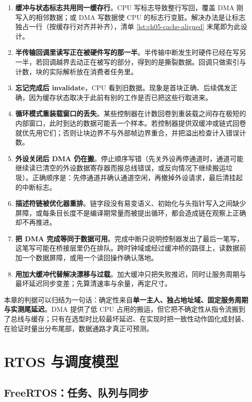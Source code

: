 \documentclass[12pt,a4paper,fontset=fandol]{ctexbook}
\begin{document}
\begin{enumerate}
\item \textbf{缓冲与状态标志共用同一缓存行}。CPU 写标志导致整行写回，覆盖 DMA 刚写入的相邻数据；或 DMA 写数据使 CPU 的标志行变脏。解决办法是让标志独占一行（按缓存行对齐并补齐），清单 \ref{lst:ch05-cache-aligned} 末尾即为此设计。
\item \textbf{半传输回调里读写正在被硬件写的那一半}。半传输中断发生时硬件已经在写另一半，若回调越界去动正在被写的部分，得到的是撕裂数据。回调只做索引与计数，块的实际解析放在消费者任务里。
\item \textbf{忘记完成后 invalidate}，CPU 看到旧数据。现象是首块正确、后续偶发正确，因为缓存状态取决于此前有别的工作是否已把这些行取进来。
\item \textbf{循环模式重装载窗口的丢失}。某些控制器在计数回卷到重装载之间存在极短的内部窗口，此时到达的数据可能丢一个样本。若控制器提供双缓冲或链式回卷就优先用它们；否则让块边界不与外部帧边界重合，并把溢出检查计入错误计数。
\item \textbf{外设关闭后 DMA 仍在搬}。停止顺序写错（先关外设再停通道时，通道可能继续读已清空的外设数据寄存器而报总线错误，或反向情况下继续搬运垃圾）。正确顺序是：先停通道并确认通道空闲，再撤掉外设请求，最后清挂起的中断标志。
\item \textbf{描述符链被优化器重排}。链字段没有易变语义、初始化与头指针写入之间缺少屏障，或每条目长度不是编译期常量而被提出循环，都会造成链在观察上正确却不再推进。
\item \textbf{把 DMA 完成等同于数据可用}。完成中断只说明控制器发出了最后一笔写，这笔写可能在桥接层里仍在排队。跨时钟域或经过缓冲桥的路径上，读数据前加一个数据屏障，或用一个读回操作确认落地。
\item \textbf{用加大缓冲代替解决漂移与过载}。加大缓冲只把失败推迟，同时让服务周期与最坏延迟同步变差；先算清速率与余量，再定尺寸。
\end{enumerate}

本章的判据可以归结为一句话：确定性来自\textbf{单一主人、独占地址域、固定服务周期与实测尾延迟}。DMA 提供了低 CPU 占用的搬运，但它把不确定性从指令流搬到了总线与缓存；只有在选型时比较最坏延迟、在实现时把一致性动作固化成封装、在验证时量出分布尾部，数据通路才真正可预测。

\part{RTOS 与调度模型}

\chapter{FreeRTOS：任务、队列与同步}
\end{document}

